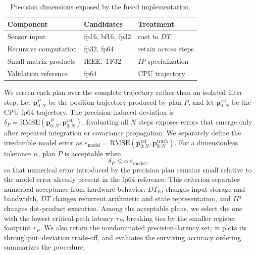 \begin{table}[H]
  \centering
  \caption{Precision dimensions exposed by the fused implementation.}
  \label{tab:precision-design}
  \begin{tabular}{@{}lll@{}}
    \toprule
    Component & Candidates & Treatment \\
    \midrule
    Sensor input & fp16, bf16, fp32 & cast to $\mathit{DT}$ \\
    Recursive computation & fp32, fp64 & retain across steps \\
    Small matrix products & IEEE, TF32 & $\mathit{IP}$ specialization \\
    Validation reference & fp64 & CPU trajectory \\
    \bottomrule
  \end{tabular}
\end{table}

We screen each plan over the complete trajectory rather than an isolated filter step. Let $\mathbf{p}^{P}_{0:N}$ be the position trajectory produced by plan $P$, and let $\mathbf{p}^{\mathrm{ref}}_{0:N}$ be the CPU fp64 trajectory. The precision-induced deviation is
\(
  \delta_{P}=\mathrm{RMSE}(\mathbf{p}^{P}_{0:N},\mathbf{p}^{\mathrm{ref}}_{0:N}).
\)
Evaluating all $N$ steps exposes errors that emerge only after repeated integration or covariance propagation. We separately define the irreducible model error as $\varepsilon_{\mathrm{model}}=\mathrm{RMSE}(\mathbf{p}^{\mathrm{ref}}_{0:N},\mathbf{p}^{\mathrm{truth}}_{0:N})$. For a dimensionless tolerance $\alpha$, plan $P$ is acceptable when
\begin{equation}
  \delta_{P}\le\alpha\,\varepsilon_{\mathrm{model}},
  \label{eq:precision-accept}
\end{equation}
so that numerical error introduced by the precision plan remains small relative to the model error already present in the fp64 reference. This criterion separates numerical acceptance from hardware behavior: $\mathit{DT}_{\mathrm{IO}}$ changes input storage and bandwidth, $\mathit{DT}$ changes recurrent arithmetic and state representation, and $\mathit{IP}$ changes dot-product execution. Among the acceptable plans, we select the one with the lowest critical-path latency $\tau_{P}$, breaking ties by the smaller register footprint $r_{P}$. We also retain the nondominated precision--latency set;  in  plots its throughput--deviation trade-off, and  evaluates the surviving accuracy ordering.  summarizes the procedure.

